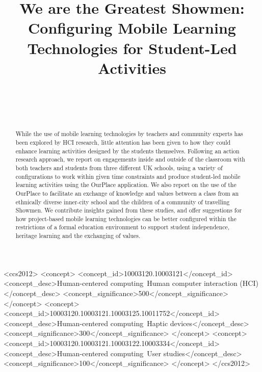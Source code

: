 \documentclass{sigchi}
\begin{document}
\title{We are the Greatest Showmen: Configuring Mobile Learning Technologies for Student-Led Activities}

\author{%
  \\
  \\
  \\
}

\maketitle

\begin{abstract}
While the use of mobile learning technologies by teachers and community experts has been explored by HCI research, little attention has been given to how they could enhance learning activities designed by the students themselves. Following an action research approach, we report on engagements inside and outside of the classroom with both teachers and students from three different UK schools, using a variety of configurations to work within given time constraints and produce student-led mobile learning activities using the OurPlace application. We also report on the use of the OurPlace to facilitate an exchange of knowledge and values between a class from an ethnically diverse inner-city school and the children of a community of travelling Showmen. We contribute insights gained from these studies, and offer suggestions for how project-based mobile learning technologies can be better configured within the restrictions of a formal education environment to support student independence, heritage learning and the exchanging of values.
\end{abstract}



\begin{CCSXML}
<ccs2012>
<concept>
<concept_id>10003120.10003121</concept_id>
<concept_desc>Human-centered computing~Human computer interaction (HCI)</concept_desc>
<concept_significance>500</concept_significance>
</concept>
<concept>
<concept_id>10003120.10003121.10003125.10011752</concept_id>
<concept_desc>Human-centered computing~Haptic devices</concept_desc>
<concept_significance>300</concept_significance>
</concept>
<concept>
<concept_id>10003120.10003121.10003122.10003334</concept_id>
<concept_desc>Human-centered computing~User studies</concept_desc>
<concept_significance>100</concept_significance>
</concept>
</ccs2012>
\end{CCSXML}
\end{document}

